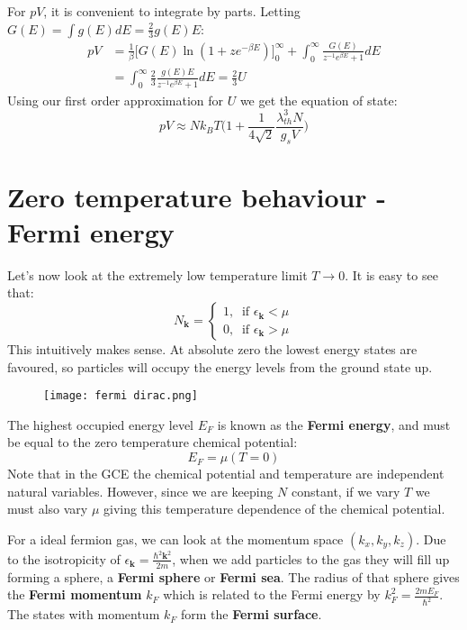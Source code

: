 \documentclass[a4paper,11pt,oneside]{book}
\begin{document}
For $pV$, it is convenient to integrate by parts. Letting $G(E) = \int g(E)dE = \frac{2}{3}g(E)E$:
\begin{align}
    pV &= \frac{1}{\beta}\bigg[G(E) \ln(1+ze^{-\beta E})\bigg]_0^\infty +\int_0^\infty \frac{G(E)}{z^{-1}e^{\beta E}+1} dE\\
    &=  \int_0^\infty \frac{2}{3}\frac{g(E) E}{z^{-1}e^{\beta E}+1} dE = \frac{2}{3}U
\end{align}
Using our first order approximation for $U$ we get the equation of state:
\begin{equation}
    \boxed{pV \approx Nk_B T\bigg(1+\frac{1}{4\sqrt{2}}\frac{\lambda_{th}^3 N}{g_sV}\bigg)}
\end{equation}
\section{Zero temperature behaviour - Fermi energy}
Let's now look at the extremely low temperature limit $T \rightarrow 0$. It is easy to see that:
\begin{equation}
   N_\textbf{k} = \begin{cases}
     1, \ \text{ if } \epsilon_{\textbf{k}}<\mu\\
     0, \ \text{ if } \epsilon_{\textbf{k}}>\mu
    \end{cases}
\end{equation}
This intuitively makes sense. At absolute zero the lowest energy states are favoured, so particles will occupy the energy levels from the ground state up. 
\begin{figure}[h!]
    \centering
    \texttt{[image: fermi dirac.png]}
    \label{fig:my_label}
\end{figure}

The highest occupied energy level $E_F$ is known as the \textbf{Fermi energy}, and must be equal to the zero temperature chemical potential:
\begin{equation}
    E_F = \mu(T=0)
\end{equation}
Note that in the GCE the chemical potential and temperature are independent natural variables. However, since we are keeping $N$ constant, if we vary $T$ we must also vary $\mu$ giving this temperature dependence of the chemical potential.

For a ideal fermion gas, we can look at the momentum space $(k_x,k_y,k_z)$. Due to the isotropicity of $\epsilon_\textbf{k} = \frac{\hbar^2 \textbf{k}^2}{2m}$, when we add particles to the gas they will fill up forming a sphere, a \textbf{Fermi sphere} or \textbf{Fermi sea}. The radius of that sphere gives the \textbf{Fermi momentum} $k_F$ which is related to the Fermi energy by $k_F^2 = \frac{2mE_F}{\hbar^2}$. The states with momentum $k_F$ form the \textbf{Fermi surface}.
\end{document}
